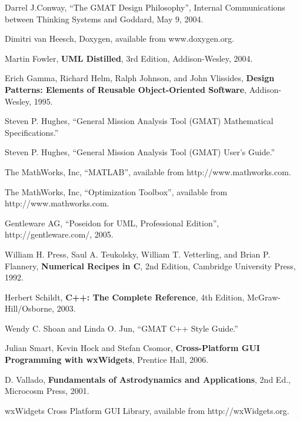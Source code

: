 \documentclass[letterpaper,10pt]{book}
\begin{document}
\begin{thebibliography}{poseidon} %

 Darrel J.Conway, ``The GMAT Design Philosophy'', Internal
Communications between Thinking Systems and Goddard, May 9, 2004.

 Dimitri van Heesch, Doxygen, available from www.doxygen.org.

 Martin Fowler, \textbf{UML Distilled}, 3rd Edition, Addison-Wesley,
2004.

 Erich Gamma, Richard Helm, Ralph Johnson, and John Vlissides, \textbf{Design
Patterns: Elements of Reusable Object-Oriented Software}, Addison-Wesley, 1995.

 Steven P. Hughes, ``General Mission Analysis Tool (GMAT) Mathematical
Specifications.''

 Steven P. Hughes, ``General Mission Analysis Tool (GMAT) User's
Guide.''

 The MathWorks, Inc, ``MATLAB'', available from http://www.mathworks.com.

 The MathWorks, Inc, ``Optimization Toolbox'', available from
http://www.mathworks.com.

 Gentleware AG, ``Poseidon for UML, Professional Edition'',
http://gentleware.com/, 2005.

 William H. Press, Saul A. Teukolsky, William T. Vetterling, and Brian
P. Flannery, \textbf{Numerical Recipes in C}, 2nd Edition, Cambridge University Press, 1992.

 Herbert Schildt, \textbf{C++: The Complete Reference}, 4th Edition,
McGraw-Hill/Osborne, 2003.

 Wendy C. Shoan and Linda O. Jun, ``GMAT C++ Style Guide.''

 Julian Smart, Kevin Hock and Stefan Csomor, \textbf{Cross-Platform GUI
Programming with wxWidgets}, Prentice Hall, 2006.

D. Vallado, \textbf{Fundamentals of Astrodynamics and Applications},
2nd Ed., Microcosm Press, 2001.

 wxWidgets Cross Platform GUI Library, available from http://wxWidgets.org.

\end{thebibliography}

\printindex
\end{document}
